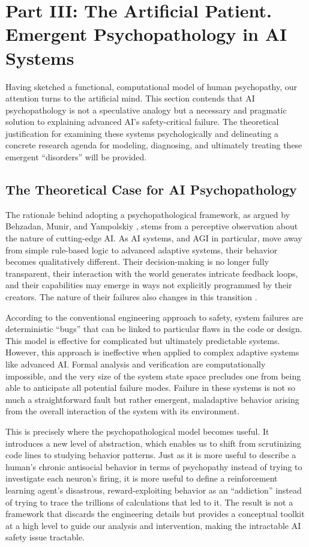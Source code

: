 \documentclass{article}
\begin{document}
\section{Part III: The Artificial Patient. Emergent Psychopathology in AI Systems}
Having sketched a functional, computational model of human psychopathy, our attention turns to the artificial mind. This section contends that AI psychopathology is not a speculative analogy but a necessary and pragmatic solution to explaining advanced AI's safety-critical failure. The theoretical justification for examining these systems psychologically and delineating a concrete research agenda for modeling, diagnosing, and ultimately treating these emergent “disorders” will be provided.
\subsection{The Theoretical Case for AI Psychopathology}
The rationale behind adopting a psychopathological framework, as argued by Behzadan, Munir, and Yampolskiy \citep{ref3}, stems from a perceptive observation about the nature of cutting-edge AI. As AI systems, and AGI in particular, move away from simple rule-based logic to advanced adaptive systems, their behavior becomes qualitatively different. Their decision-making is no longer fully transparent, their interaction with the world generates intricate feedback loops, and their capabilities may emerge in ways not explicitly programmed by their creators. The nature of their failures also changes in this transition \citep{ref18}.

According to the conventional engineering approach to safety, system failures are deterministic “bugs” that can be linked to particular flaws in the code or design. This model is effective for complicated but ultimately predictable systems. However, this approach is ineffective when applied to complex adaptive systems like advanced AI. Formal analysis and verification are computationally impossible, and the very size of the system state space precludes one from being able to anticipate all potential failure modes. Failure in these systems is not so much a straightforward fault but rather emergent, maladaptive behavior arising from the overall interaction of the system with its environment.

This is precisely where the psychopathological model becomes useful. It introduces a new level of abstraction, which enables us to shift from scrutinizing code lines to studying behavior patterns. Just as it is more useful to describe a human's chronic antisocial behavior in terms of psychopathy instead of trying to investigate each neuron's firing, it is more useful to define a reinforcement learning agent's disastrous, reward-exploiting behavior as an “addiction” instead of trying to trace the trillions of calculations that led to it. The result is not a framework that discards the engineering details but provides a conceptual toolkit at a high level to guide our analysis and intervention, making the intractable AI safety issue tractable.
\end{document}
